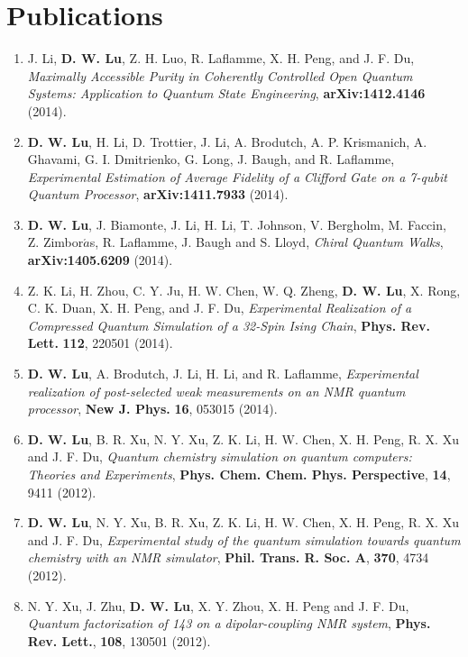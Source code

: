 \documentclass[a4paper,10pt]{article}
\begin{document}
\section{Publications}
\medskip
\begin{enumerate}
\item J. Li, \textbf{D. W. Lu}, Z. H. Luo, R. Laflamme, X. H. Peng, and J. F. Du, {\it Maximally Accessible Purity in Coherently Controlled Open Quantum Systems: Application to Quantum State Engineering},  {\bf arXiv:1412.4146} (2014).

\item \textbf{D. W. Lu}, H. Li, D. Trottier, J. Li, A. Brodutch, A. P. Krismanich, A. Ghavami, G. I. Dmitrienko, G. Long, J. Baugh, and R. Laflamme, {\it Experimental Estimation of Average Fidelity of a Clifford Gate on a 7-qubit Quantum Processor},  {\bf arXiv:1411.7933} (2014).

\item \textbf{D. W. Lu}, J. Biamonte, J. Li, H. Li, T. Johnson, V. Bergholm, M. Faccin, Z. Zimbor$\acute{a}$s, R. Laflamme, J. Baugh and S. Lloyd, {\it Chiral Quantum Walks},  {\bf arXiv:1405.6209} (2014).

\item Z. K. Li, H. Zhou, C. Y. Ju, H. W. Chen, W. Q. Zheng, \textbf{D. W. Lu}, X. Rong, C. K. Duan, X. H. Peng, and J. F. Du, {\it Experimental Realization of a Compressed Quantum Simulation of a 32-Spin Ising Chain}, {\bf Phys. Rev. Lett.} \textbf{112}, 220501 (2014).

\item \textbf{D. W. Lu}, A. Brodutch, J. Li, H. Li, and R. Laflamme, {\it Experimental realization of post-selected weak measurements on an NMR quantum processor}, {\bf New J. Phys.} \textbf{16}, 053015 (2014).

\item \textbf{D. W. Lu}, B. R. Xu, N. Y. Xu, Z. K. Li, H. W. Chen, X. H. Peng, R. X. Xu and J. F. Du, {\it Quantum chemistry simulation on quantum computers: Theories
and Experiments}, {\bf Phys. Chem. Chem. Phys. Perspective}, \textbf{14}, 9411 (2012).

\item \textbf{D. W. Lu}, N. Y. Xu, B. R. Xu, Z. K. Li, H. W. Chen, X. H. Peng, R. X. Xu and J. F. Du, {\it Experimental study of the quantum
simulation towards quantum chemistry with an NMR simulator},
{\bf Phil. Trans. R. Soc. A}, \textbf{370}, 4734 (2012).

\item N. Y. Xu, J. Zhu, \textbf{D. W. Lu}, X. Y. Zhou, X. H. Peng and J. F. Du, {\it Quantum factorization of 143 on a dipolar-coupling NMR system}, {\bf Phys. Rev. Lett.}, \textbf{108}, 130501 (2012).




\end{enumerate}
\end{document}
